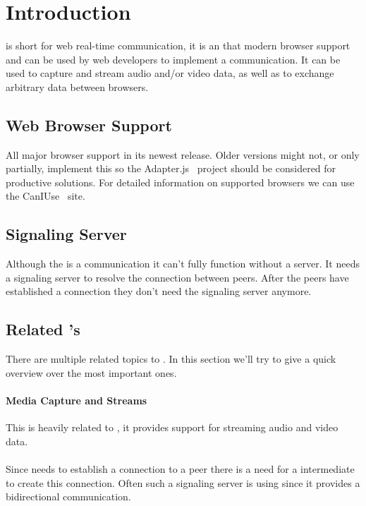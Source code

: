 \clearpage
\chapter{Introduction}
 is short for web real-time communication, it is an  that modern browser support and can be used by web developers to implement a  communication. It can be used to capture and stream audio and/or video data, as well as to exchange arbitrary data between browsers.

\section{Web Browser Support}
All major browser support  in its newest release. Older versions might not, or only partially, implement this  so the Adapter.js~\autocite{adapterjs} project should be considered for productive solutions. For detailed information on supported browsers we can use the CanIUse~\autocite{caniuse} site.

\section{Signaling Server}
Although the  is a  communication  it can't fully function without a server. It needs a signaling server to resolve the connection between peers. After the peers have established a connection they don't need the signaling server anymore.

\section{Related 's}
There are multiple related topics to . In this section we'll try to give a quick overview over the most important ones.

\subsubsection{Media Capture and Streams }
This  is heavily related to , it provides support for streaming audio and video data.

\subsubsection{}
Since  needs to establish a connection to a peer there is a need for a intermediate to create this connection. Often such a signaling server is using  since it provides a bidirectional communication.